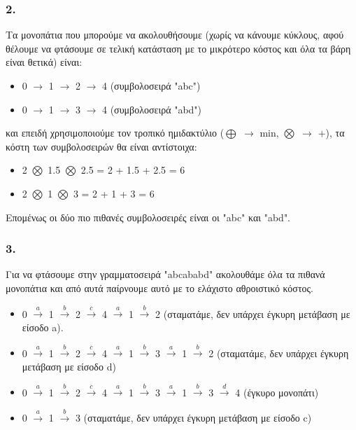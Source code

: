 \documentclass[12pt,a4paper]{article}
\begin{document}
			
		\subsubsection*{2.} 
			Τα μονοπάτια που μπορούμε να ακολουθήσουμε (χωρίς να κάνουμε κύκλους, αφού θέλουμε να φτάσουμε σε τελική κατάσταση με το μικρότερο κόστος και όλα τα βάρη είναι θετικά) είναι:
			
			\begin{itemize}
				\item 0 $\rightarrow$ 1 $\rightarrow$ 2 $\rightarrow$ 4 (συμβολοσειρά "abc")
				\item 0 $\rightarrow$ 1 $\rightarrow$ 3 $\rightarrow$ 4 (συμβολοσειρά "abd")
			\end{itemize}
			
			και επειδή χρησιμοποιούμε τον τροπικό ημιδακτύλιο ($\bigoplus$ $\rightarrow$ $\text{min}$, $\bigotimes$ $\rightarrow$ $+$), τα κόστη των συμβολοσειρών θα είναι αντίστοιχα:
			
			\begin{itemize}
				\item 2 $\bigotimes$ 1.5 $\bigotimes$ 2.5 = 2 + 1.5 + 2.5 = 6
				\item 2 $\bigotimes$ 1 $\bigotimes$ 3 = 2 + 1 + 3 = 6
			\end{itemize}
			
			Επομένως οι δύο πιο πιθανές συμβολοσειρές είναι οι "abc" και "abd".
			
		\subsubsection*{3.} 
			Για να φτάσουμε στην γραμματοσειρά "abcababd" ακολουθάμε όλα τα πιθανά μονοπάτια και από αυτά παίρνουμε αυτό με το ελάχιστο αθροιστικό κόστος.
			
			\begin{itemize}
				\item 0 $\xrightarrow{a}$ 1 $\xrightarrow{b}$ 2 $\xrightarrow{c}$ 4 $\xrightarrow{a}$ 1 $\xrightarrow{b}$ 2 (σταματάμε, δεν υπάρχει έγκυρη μετάβαση με είσοδο a).
				\item 0 $\xrightarrow{a}$ 1 $\xrightarrow{b}$ 2 $\xrightarrow{c}$ 4 $\xrightarrow{a}$ 1 $\xrightarrow{b}$ 3 $\xrightarrow{a}$ 1 $\xrightarrow{b}$ 2 (σταματάμε, δεν υπάρχει έγκυρη μετάβαση με είσοδο d)
				\item 0 $\xrightarrow{a}$ 1 $\xrightarrow{b}$ 2 $\xrightarrow{c}$ 4 $\xrightarrow{a}$ 1 $\xrightarrow{b}$ 3 $\xrightarrow{a}$ 1 $\xrightarrow{b}$ 3 $\xrightarrow{d}$ 4 (έγκυρο μονοπάτι)
				\item 0 $\xrightarrow{a}$ 1 $\xrightarrow{b}$ 3 (σταματάμε, δεν υπάρχει έγκυρη μετάβαση με είσοδο c)
			\end{itemize}
			
\end{document}
